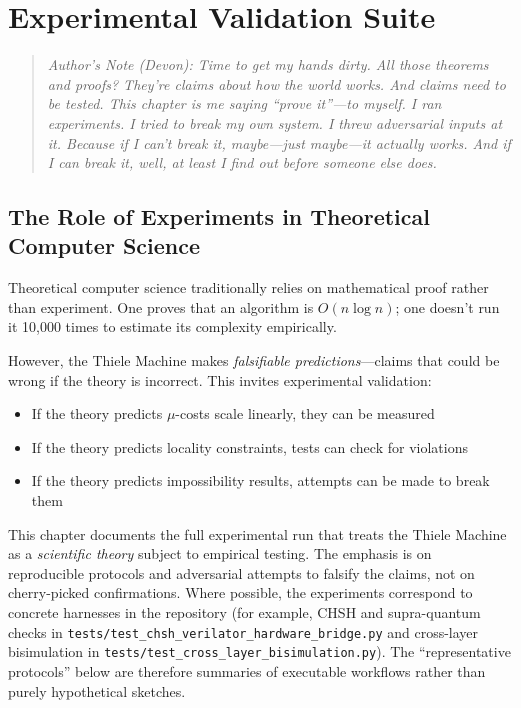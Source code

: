 \section{Experimental Validation Suite}

\begin{quote}
\textit{Author's Note (Devon): Time to get my hands dirty. All those theorems and proofs? They're claims about how the world works. And claims need to be tested. This chapter is me saying ``prove it''---to myself. I ran experiments. I tried to break my own system. I threw adversarial inputs at it. Because if I can't break it, maybe---just maybe---it actually works. And if I can break it, well, at least I find out before someone else does.}
\end{quote}

\subsection{The Role of Experiments in Theoretical Computer Science}

Theoretical computer science traditionally relies on mathematical proof rather than experiment. One proves that an algorithm is $O(n \log n)$; one doesn't run it 10,000 times to estimate its complexity empirically.

However, the Thiele Machine makes \textit{falsifiable predictions}---claims that could be wrong if the theory is incorrect. This invites experimental validation:
\begin{itemize}
    \item If the theory predicts $\mu$-costs scale linearly, they can be measured
    \item If the theory predicts locality constraints, tests can check for violations
    \item If the theory predicts impossibility results, attempts can be made to break them
\end{itemize}

This chapter documents the full experimental run that treats the Thiele Machine as a \textit{scientific theory} subject to empirical testing. The emphasis is on reproducible protocols and adversarial attempts to falsify the claims, not on cherry-picked confirmations.
Where possible, the experiments correspond to concrete harnesses in the repository (for example, CHSH and supra-quantum checks in \texttt{tests/test\_chsh\_verilator\_hardware\_bridge.py} and cross-layer bisimulation in \texttt{tests/test\_cross\_layer\_bisimulation.py}). The “representative protocols” below are therefore summaries of executable workflows rather than purely hypothetical sketches.

